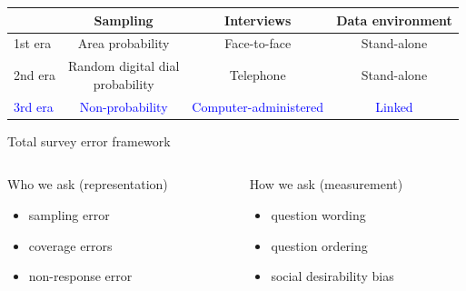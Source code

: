 \documentclass[aspectratio=169]{beamer}
\begin{document}
\begin{frame}

\begin{center}
\small{
\begin{tabular}{ l c c c}
           & Sampling & Interviews & Data environment\\
\hline
1st era & Area probability & Face-to-face & Stand-alone \\
2nd era & \parbox[t]{3cm}{\centering Random digital dial\\probability} & Telephone & Stand-alone \\
\textcolor{blue}{3rd era} & \textcolor{blue}{Non-probability} & \textcolor{blue}{Computer-administered}  & \textcolor{blue}{Linked} \\
\end{tabular}
}
\end{center}

\end{frame}
\begin{frame}

\begin{center}
Total survey error framework
\end{center}

\pause 

\begin{columns}[T]

\begin{column}{0.48\textwidth}

{\Large Who we ask} (representation)\\
\begin{itemize}
\item sampling error
\item coverage errors
\item non-response error
\end{itemize}
\end{column}


\begin{column}{0.48\textwidth}
{\Large How we ask} (measurement)\\
\begin{itemize}
\item question wording
\item question ordering
\item social desirability bias
\end{itemize}
\end{column}

\end{columns}

\end{frame}
\end{document}
